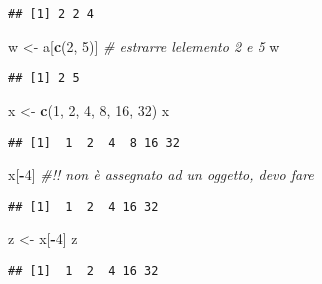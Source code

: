 \documentclass[
]{article}
\newenvironment{Shaded}{\begin{snugshade}}{\end{snugshade}}
\newcommand{\CommentTok}[1]{\textcolor[rgb]{0.56,0.35,0.01}{\textit{#1}}}
\newcommand{\DecValTok}[1]{\textcolor[rgb]{0.00,0.00,0.81}{#1}}
\newcommand{\FunctionTok}[1]{\textcolor[rgb]{0.13,0.29,0.53}{\textbf{#1}}}
\newcommand{\NormalTok}[1]{#1}
\newcommand{\OtherTok}[1]{\textcolor[rgb]{0.56,0.35,0.01}{#1}}
\newcommand{\SpecialCharTok}[1]{\textcolor[rgb]{0.81,0.36,0.00}{\textbf{#1}}}
\begin{document}
\begin{verbatim}
## [1] 2 2 4
\end{verbatim}

\begin{Shaded}
\begin{Highlighting}[]
\NormalTok{w }\OtherTok{\textless{}{-}}\NormalTok{ a[}\FunctionTok{c}\NormalTok{(}\DecValTok{2}\NormalTok{, }\DecValTok{5}\NormalTok{)] }\CommentTok{\# estrarre l\textquotesingle{}elemento 2 e 5}
\NormalTok{w}
\end{Highlighting}
\end{Shaded}

\begin{verbatim}
## [1] 2 5
\end{verbatim}

\begin{Shaded}
\begin{Highlighting}[]
\NormalTok{x }\OtherTok{\textless{}{-}} \FunctionTok{c}\NormalTok{(}\DecValTok{1}\NormalTok{, }\DecValTok{2}\NormalTok{, }\DecValTok{4}\NormalTok{, }\DecValTok{8}\NormalTok{, }\DecValTok{16}\NormalTok{, }\DecValTok{32}\NormalTok{)}
\NormalTok{x}
\end{Highlighting}
\end{Shaded}

\begin{verbatim}
## [1]  1  2  4  8 16 32
\end{verbatim}

\begin{Shaded}
\begin{Highlighting}[]
\NormalTok{x[}\SpecialCharTok{{-}}\DecValTok{4}\NormalTok{] }\CommentTok{\#!! non è assegnato ad un oggetto, devo fare}
\end{Highlighting}
\end{Shaded}

\begin{verbatim}
## [1]  1  2  4 16 32
\end{verbatim}

\begin{Shaded}
\begin{Highlighting}[]
\NormalTok{z }\OtherTok{\textless{}{-}}\NormalTok{ x[}\SpecialCharTok{{-}}\DecValTok{4}\NormalTok{]}
\NormalTok{z}
\end{Highlighting}
\end{Shaded}

\begin{verbatim}
## [1]  1  2  4 16 32
\end{verbatim}
\end{document}

